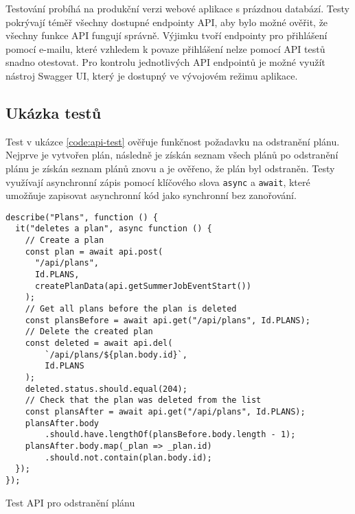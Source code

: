 Testování probíhá na produkční verzi webové aplikace s prázdnou databází. Testy pokrývají téměř všechny dostupné endpointy API, aby bylo možné
ověřit, že všechny funkce API fungují správně. Výjimku tvoří endpointy pro přihlášení pomocí e-mailu, které vzhledem k povaze přihlášení nelze 
pomocí API testů snadno otestovat. Pro kontrolu jednotlivých API endpointů je možné využít nástroj Swagger UI, který je dostupný ve vývojovém režimu aplikace.

\subsection{Ukázka testů}

Test v ukázce \ref{code:api-test} ověřuje funkčnost požadavku na odstranění plánu.
Nejprve je vytvořen plán, následně je získán seznam všech plánů po odstranění plánu je získán seznam plánů znovu a je ověřeno, že plán byl odstraněn.
Testy využívají asynchronní zápis pomocí klíčového slova \texttt{async} a \texttt{await}, které umožňuje zapisovat asynchronní kód jako synchronní bez zanořování.


\begin{listing}[h]
\begin{verbatim}
describe("Plans", function () {
  it("deletes a plan", async function () {
    // Create a plan
    const plan = await api.post(
      "/api/plans",
      Id.PLANS,
      createPlanData(api.getSummerJobEventStart())
    );
    // Get all plans before the plan is deleted
    const plansBefore = await api.get("/api/plans", Id.PLANS);
    // Delete the created plan
    const deleted = await api.del(
        `/api/plans/${plan.body.id}`,
        Id.PLANS
    );
    deleted.status.should.equal(204);
    // Check that the plan was deleted from the list
    const plansAfter = await api.get("/api/plans", Id.PLANS);
    plansAfter.body
        .should.have.lengthOf(plansBefore.body.length - 1);
    plansAfter.body.map(_plan => _plan.id)
        .should.not.contain(plan.body.id);
  });
});
\end{verbatim}
\caption{Test API pro odstranění plánu}
\label{code:api-test}
\end{listing}
